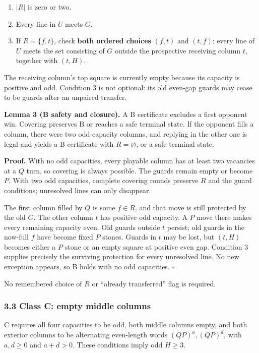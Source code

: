\documentclass[
  a4paper,
]{article}
\providecommand{\tightlist}{%
  \setlength{\itemsep}{0pt}\setlength{\parskip}{0pt}}
\begin{document}
\begin{enumerate}
\def\labelenumi{\arabic{enumi}.}
\tightlist
\item
  \(|R|\) is zero or two.
\item
  Every line in \(U\) meets \(G\).
\item
  If \(R=\{f,t\}\), check \textbf{both ordered choices} \((f,t)\) and
  \((t,f)\): every line of \(U\) meets the set consisting of \(G\)
  outside the prospective receiving column \(t\), together with
  \((t,H)\).
\end{enumerate}

The receiving column's top square is currently empty because its
capacity is positive and odd. Condition 3 is not optional: its old
even-gap guards may cease to be guards after an unpaired transfer.

\textbf{Lemma 3 (B safety and closure).} A B certificate excludes a
first opponent win. Covering preserves B or reaches a safe terminal
state. If the opponent fills a column, there were two odd-capacity
columns, and replying in the other one is legal and yields a B
certificate with \(R=\varnothing\), or a safe terminal state.

\textbf{Proof.} With no odd capacities, every playable column has at
least two vacancies at a \(Q\) turn, so covering is always possible. The
guards remain empty or become \(P\). With two odd capacities, complete
covering rounds preserve \(R\) and the guard conditions; unresolved
lines can only disappear.

The first column filled by \(Q\) is some \(f\in R\), and that move is
still protected by the old \(G\). The other column \(t\) has positive
odd capacity. A \(P\) move there makes every remaining capacity even.
Old guards outside \(t\) persist; old guards in the now-full \(f\) have
become fixed \(P\) stones. Guards in \(t\) may be lost, but \((t,H)\)
becomes either a \(P\) stone or an empty square at positive even gap.
Condition 3 supplies precisely the surviving protection for every
unresolved line. No new exception appears, so B holds with no odd
capacities. \(\square\)

No remembered choice of \(R\) or ``already transferred'' flag is
required.

\subsubsection{3.3 Class C: empty middle
columns}\label{class-c-empty-middle-columns}

C requires all four capacities to be odd, both middle columns empty, and
both exterior columns to be alternating even-length words
\((QP)^a,(QP)^d\), with \(a,d\ge0\) and \(a+d>0\). These conditions
imply odd \(H\ge3\).
\end{document}
